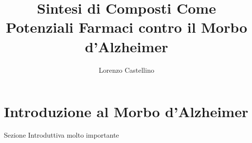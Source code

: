 \documentclass{article}
\title{Sintesi di Composti Come Potenziali Farmaci contro il Morbo d'Alzheimer}
\author{Lorenzo Castellino}
\begin{document}
\maketitle
\newpage
{}
\tableofcontents
\newpage
\section{Introduzione al Morbo d'Alzheimer}
Sezione Introduttiva molto importante 
\end{document}
